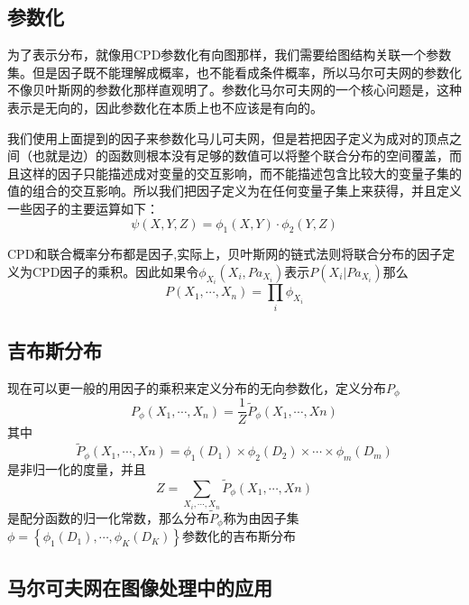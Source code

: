 \documentclass{article} %
\begin{document}
\begin{CJK*}{UTF8}{gkai}
\subsection{参数化}
为了表示分布，就像用CPD参数化有向图那样，我们需要给图结构关联一个参数集。但是因子既不能理解成概率，也不能看成条件概率，所以马尔可夫网的参数化不像贝叶斯网的参数化那样直观明了。参数化马尔可夫网的一个核心问题是，这种表示是无向的，因此参数化在本质上也不应该是有向的。

我们使用上面提到的因子来参数化马儿可夫网，但是若把因子定义为成对的顶点之间（也就是边）的函数则根本没有足够的数值可以将整个联合分布的空间覆盖，而且这样的因子只能描述成对变量的交互影响，而不能描述包含比较大的变量子集的值的组合的交互影响。所以我们把因子定义为在任何变量子集上来获得，并且定义一些因子的主要运算如下：
\begin{equation}
\psi \left( X,Y,Z \right) = \phi _{1} \left( X,Y \right) \cdot \phi _{2} \left( Y,Z \right)
\end{equation}

CPD和联合概率分布都是因子,实际上，贝叶斯网的链式法则将联合分布的因子定义为CPD因子的乘积。因此如果令$\phi _{X _{i}} \left( X _{i},Pa _{X _{i}} \right)$表示$P \left( X _{i} \vert Pa _{X _{i}} \right)$那么
\begin{equation}
P \left( X _{1}, \cdots ,X _{n} \right)=\prod _{i} \phi _{X _{i}}
\end{equation}

\subsection*{吉布斯分布}
现在可以更一般的用因子的乘积来定义分布的无向参数化，定义分布$P_{\phi}$ 
\begin{equation}
P_{\phi} \left( X _{1}, \cdots ,X _{n} \right)=\frac{1}{Z} \tilde{P}_{\phi} \left( X_{1},\cdots,X{n} \right)
\end{equation}
其中
\begin{equation}
\tilde{P}_{\phi} \left( X_{1},\cdots,X{n} \right)=\phi_{1}\left(D_{1}\right)\times\phi_{2}\left(D_{2}\right)\times\cdots\times\phi_{m}\left(D_{m}\right)
\end{equation}
是非归一化的度量，并且
\begin{equation}
Z=\sum_{X_{i},\cdots,X_{n}}\tilde{P}_{\phi} \left( X_{1},\cdots,X{n} \right)
\end{equation}
是配分函数的归一化常数，那么分布$\tilde{P}_{\phi}$称为由因子集$\phi=\left\lbrace \phi_{1}\left(D_{1}\right),\cdots,\phi_{K}\left(D_{K}\right)\right\rbrace$参数化的吉布斯分布
\subsection{马尔可夫网在图像处理中的应用}


\end{CJK*}
\end{document}
